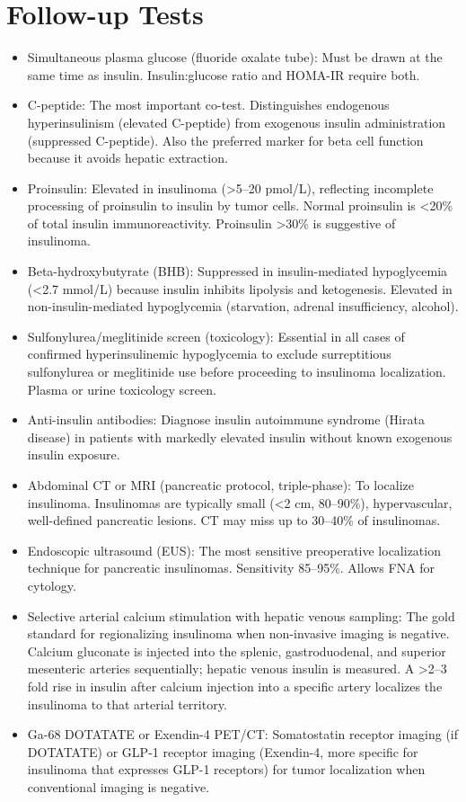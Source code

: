 \section*{Follow-up Tests}
\begin{itemize}
  \item Simultaneous plasma glucose (fluoride oxalate tube): Must be drawn at the same time as insulin. Insulin:glucose ratio and HOMA-IR require both.
  \item C-peptide: The most important co-test. Distinguishes endogenous hyperinsulinism (elevated C-peptide) from exogenous insulin administration (suppressed C-peptide). Also the preferred marker for beta cell function because it avoids hepatic extraction.
  \item Proinsulin: Elevated in insulinoma (>5--20 pmol/L), reflecting incomplete processing of proinsulin to insulin by tumor cells. Normal proinsulin is <20\% of total insulin immunoreactivity. Proinsulin >30\% is suggestive of insulinoma.
  \item Beta-hydroxybutyrate (BHB): Suppressed in insulin-mediated hypoglycemia (<2.7 mmol/L) because insulin inhibits lipolysis and ketogenesis. Elevated in non-insulin-mediated hypoglycemia (starvation, adrenal insufficiency, alcohol).
  \item Sulfonylurea/meglitinide screen (toxicology): Essential in all cases of confirmed hyperinsulinemic hypoglycemia to exclude surreptitious sulfonylurea or meglitinide use before proceeding to insulinoma localization. Plasma or urine toxicology screen.
  \item Anti-insulin antibodies: Diagnose insulin autoimmune syndrome (Hirata disease) in patients with markedly elevated insulin without known exogenous insulin exposure.
  \item Abdominal CT or MRI (pancreatic protocol, triple-phase): To localize insulinoma. Insulinomas are typically small (<2 cm, 80--90\%), hypervascular, well-defined pancreatic lesions. CT may miss up to 30--40\% of insulinomas.
  \item Endoscopic ultrasound (EUS): The most sensitive preoperative localization technique for pancreatic insulinomas. Sensitivity 85--95\%. Allows FNA for cytology.
  \item Selective arterial calcium stimulation with hepatic venous sampling: The gold standard for regionalizing insulinoma when non-invasive imaging is negative. Calcium gluconate is injected into the splenic, gastroduodenal, and superior mesenteric arteries sequentially; hepatic venous insulin is measured. A >2--3 fold rise in insulin after calcium injection into a specific artery localizes the insulinoma to that arterial territory.
  \item Ga-68 DOTATATE or Exendin-4 PET/CT: Somatostatin receptor imaging (if DOTATATE) or GLP-1 receptor imaging (Exendin-4, more specific for insulinoma that expresses GLP-1 receptors) for tumor localization when conventional imaging is negative.
\end{itemize}

